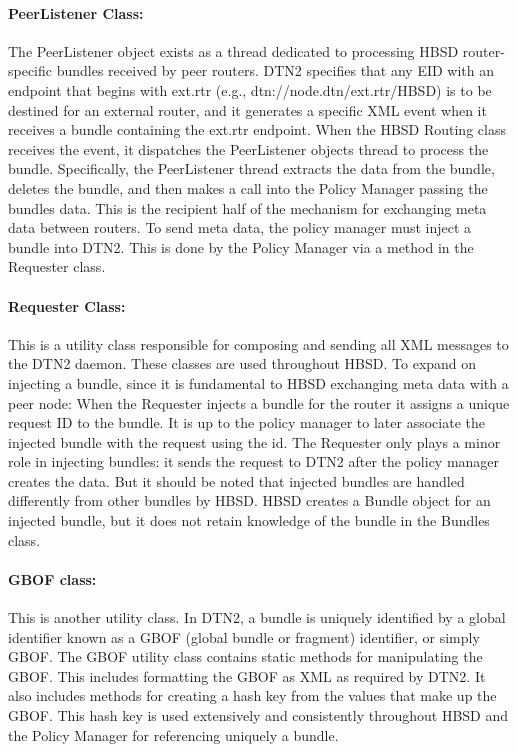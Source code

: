 \paragraph{PeerListener Class:}

The PeerListener object exists as a thread dedicated to processing HBSD
router-specific bundles received by peer routers. DTN2 specifies that any EID with an endpoint that begins with ext.rtr (e.g., dtn://node.dtn/ext.rtr/HBSD) is to be destined for an external router, and it generates a specific XML event when it receives a bundle containing the ext.rtr endpoint. When the HBSD Routing class receives the event, it dispatches the PeerListener objects thread to process the bundle. Specifically, the PeerListener thread extracts the data from the bundle, deletes the bundle, and then makes a call into the Policy Manager passing the bundles data. This is the recipient half of the mechanism for exchanging meta data between routers. To send meta data, the policy manager must inject a bundle into DTN2. This is done by the Policy Manager via a method in the Requester class.


\paragraph{Requester Class:}

This is a utility class responsible for composing and sending all XML messages to the DTN2 daemon. These classes are used throughout HBSD.
To expand on injecting a bundle, since it is fundamental to HBSD exchanging meta data with a peer node: When the Requester injects a bundle for the router it assigns a unique request ID to the bundle. It is up to the policy manager to later associate the injected bundle with the request using the id. The Requester only plays a minor role in injecting bundles: it sends the request to DTN2 after the policy manager creates the data. But it should be noted that injected bundles are handled differently from other bundles by HBSD. HBSD creates a Bundle object for an injected bundle, but it does not retain knowledge of the bundle in the Bundles class.

\paragraph{GBOF class:}
This is another utility class. In DTN2, a bundle is uniquely identified by a global identifier known as a GBOF (global bundle or fragment) identifier, or simply GBOF. The GBOF utility class contains static methods for manipulating the GBOF. This includes formatting the GBOF as XML as required by DTN2. It also includes methods for creating a hash key from the values that make up the GBOF. This hash key is used extensively and consistently throughout HBSD and the Policy Manager for referencing uniquely a bundle.

